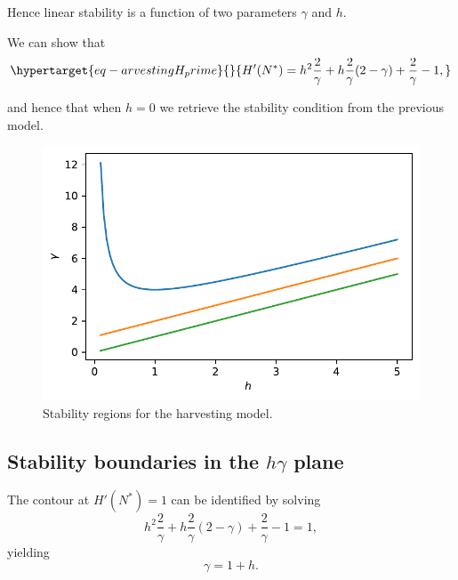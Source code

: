 \documentclass[
  letterpaper,
  DIV=11,
  numbers=noendperiod]{scrreprt}
\begin{document}
Hence linear stability is a function of two parameters \(\gamma\) and
\(h\).

We can show that\\
\begin{equation}\protect\hypertarget{eq-arvestingH_prime}{}{
H'(N^*) = h^2\frac{2}{\gamma} + h\frac{2}{\gamma}(2-\gamma) + \frac{2}{\gamma}-1,
}\label{eq-arvestingH_prime}\end{equation}

and hence that when \(h=0\) we retrieve the stability condition from the
previous model.

\begin{figure}

{\centering \includegraphics{MA32009-SinglePopDiscreteTimea_files/figure-pdf/fig-plotdensmodelharveststab-output-1.pdf}

}

\caption{\label{fig-plotdensmodelharveststab}Stability regions for the
harvesting model.}

\end{figure}

\hypertarget{stability-boundaries-in-the-hgamma-plane}{%
\subsection{\texorpdfstring{Stability boundaries in the \(h\gamma\)
plane}{Stability boundaries in the h\textbackslash gamma plane}}\label{stability-boundaries-in-the-hgamma-plane}}

The contour at \(H'(N^*)=1\) can be identified by solving \[
 h^2\frac{2}{\gamma} + h\frac{2}{\gamma}(2-\gamma) + \frac{2}{\gamma}-1 = 1,
\] yielding \[
 \gamma= 1+h.
\]
\end{document}
